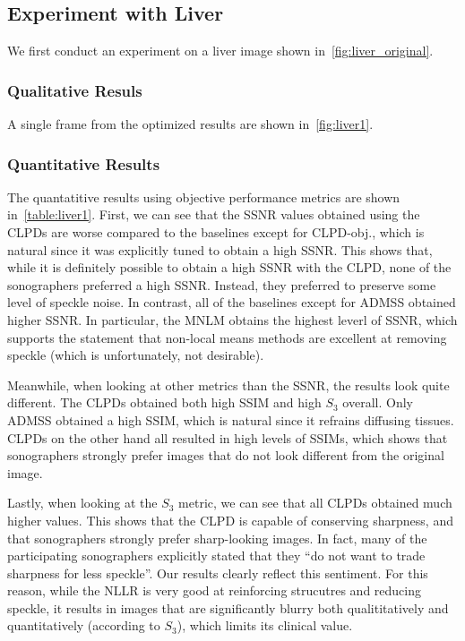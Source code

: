 \subsection{Experiment with Liver}
We first conduct an experiment on a liver image shown in~\cref{fig:liver_original}.

\subsubsection{Qualitative Resuls}
A single frame from the optimized results are shown in~\cref{fig:liver1}.



\subsubsection{Quantitative Results}
The quantatitive results using objective performance metrics are shown in~\cref{table:liver1}.
First, we can see that the SSNR values obtained using the CLPDs are worse compared to the baselines except for CLPD-obj., which is natural since it was explicitly tuned to obtain a high SSNR.
This shows that, while it is definitely possible to obtain a high SSNR with the CLPD, none of the sonographers preferred a high SSNR.
Instead, they preferred to preserve some level of speckle noise.
In contrast, all of the baselines except for ADMSS obtained higher SSNR.
In particular, the MNLM obtains the highest leverl of SSNR, which supports the statement that non-local means methods are excellent at removing speckle (which is unfortunately, not desirable).

Meanwhile, when looking at other metrics than the SSNR, the results look quite different.
The CLPDs obtained both high SSIM and high \(S_3\) overall.
Only ADMSS obtained a high SSIM, which is natural since it refrains diffusing tissues.
CLPDs on the other hand all resulted in high levels of SSIMs, which shows that sonographers strongly prefer images that do not look different from the original image.

Lastly, when looking at the \(S_3\) metric, we can see that all CLPDs obtained much higher values.
This shows that the CLPD is capable of conserving sharpness, and that sonographers strongly prefer sharp-looking images.
In fact, many of the participating sonographers explicitly stated that they ``do not want to trade sharpness for less speckle''.
Our results clearly reflect this sentiment.
For this reason, while the NLLR is very good at reinforcing strucutres and reducing speckle, it results in images that are significantly blurry both qualititatively and quantitatively (according to \(S_3\)), which limits its clinical value.



